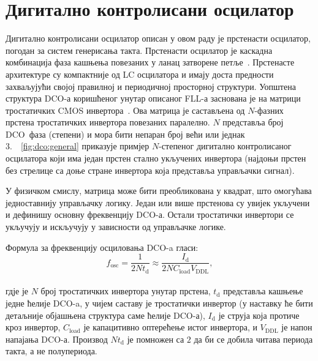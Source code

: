 \documentclass[master]{finthesis}
\def \FLL  {FLL} %
\def \DCO  {DCO} %
\begin{document}
\section{Дигитално контролисани осцилатор} \label{DCO chapter}
Дигитално контролисани осцилатор описан у овом раду је прстенасти осцилатор, погодан за систем генерисања такта. Прстенасти осцилатор је каскадна комбинација фаза кашњења повезаних у ланац затворене петље~\cite{Madhusudhana:283751064}. Прстенасте архитектуре су компактније од LC осцилатора и имају доста предности захваљујући својој правилној и периодичној просторној структури. Уопштена структура \DCO-а коришћеног унутар описаног \FLL-а заснована је на матрици тростатичких CMOS инвертора~\cite{Terosiet:340277809}. Ова матрица је састављена од $N$-фазних прстена тростатичких инвертора повезаних паралелно. $N$ представља број \DCO\ фаза (степени) и мора бити непаран број већи или једнак 3.~\figurename~\ref{fig:dco:general} приказује примјер $N$-степеног дигитално контролисаног осцилатора који има један прстен стално укључених инвертора (најдоњи прстен без стрелице са доње стране инвертора која представља управљачки сигнал). \par

У физичком смислу, матрица може бити преобликована у квадрат, што омогућава једноставнију управљачку логику. Један или више прстенова су увијек укључени и дефинишу основну фреквенцију \DCO-а. Остали тростатички инвертори се укључују и искључују у зависности од управљачке логике. \par
Формула за фреквенцију осциловања \DCO-a гласи:
\begin{equation} \label{f_osc}
    f_\text{osc} = \dfrac{1}{2Nt_\text{d}} \approx \dfrac{I_\text{d}}{2NC_\text{load}V_\text{DDL}},
\end{equation} \\
гдје је $N$ број тростатичких инвертора унутар прстена, $t_\text{d}$ представља кашњење једне ћелије \DCO-a, у чијем саставу је тростатички инвертор (у наставку ће бити детаљније објашњена структура саме ћелије \DCO-а), $I_\text{d}$ је струја која протиче кроз инвертор, $C_\text{load}$ је капацитивно оптерећење истог инвертора, и $V_\text{DDL}$ је напон напајања \DCO-а. Производ $Nt_\text{d}$ је помножен са $2$ да би се добила читава периода такта, а не полупериода. \par
\end{document}
